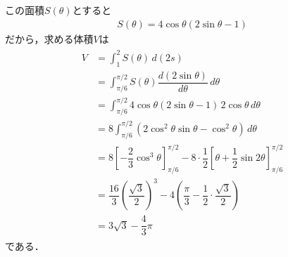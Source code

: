 \documentclass[../../main.tex]{subfiles}
\begin{document}
この面積$S(\theta)$とすると
\begin{align}
  S(\theta)=4\cos\theta(2\sin\theta-1)
\end{align}
だから，求める体積$V$は
\begin{align}
  \begin{split}
    V
    &=\int_1^2S(\theta)\,d(2s)\\
    &=\int_{\pi/6}^{\pi/2}S(\theta)\dfrac{d(2\sin\theta)}{d\theta}\,d\theta\\
    &=\int_{\pi/6}^{\pi/2}4\cos\theta(2\sin\theta-1)\,2\cos\theta\,d\theta\\
    &=8\int_{\pi/6}^{\pi/2}(2\cos^2\theta\sin\theta-\cos^2\theta)\,d\theta\\
    &=8\left[-\dfrac{2}{3}\cos^3\theta\right]_{\pi/6}^{\pi/2}
    -8\cdot\dfrac{1}{2}\left[\theta+\dfrac{1}{2}\sin2\theta\right]_{\pi/6}^{\pi/2}\\
    &=\dfrac{16}{3}\left(\dfrac{\sqrt{3}}{2}\right)^3
    -4\left(\dfrac{\pi}{3}-\dfrac{1}{2}\cdot\dfrac{\sqrt{3}}{2}\right)\\
    &=3\sqrt{3}-\dfrac{4}{3}\pi
  \end{split}
\end{align}
である．
\end{document}
